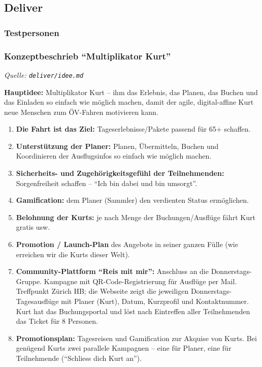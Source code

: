 \clearpage
\pagecolor{anhangPastel}
\subsection{Deliver}

\subsubsection{Testpersonen}
\clearpage
{}

\clearpage
\subsubsection{Konzeptbeschrieb \enquote{Multiplikator Kurt}}
\textit{Quelle: \texttt{deliver/idee.md}}

\medskip
\textbf{Hauptidee:} Multiplikator Kurt -- ihm das Erlebnis, das Planen, das
Buchen und das Einladen so einfach wie möglich machen, damit der agile,
digital-affine Kurt neue Menschen zum ÖV-Fahren motivieren kann.

\begin{enumerate}[nosep]
  \item \textbf{Die Fahrt ist das Ziel:} Tageserlebnisse/Pakete passend für 65+ schaffen.
  \item \textbf{Unterstützung der Planer:} Planen, Übermitteln, Buchen und Koordinieren der Ausflugsinfos so einfach wie möglich machen.
  \item \textbf{Sicherheits- und Zugehörigkeitsgefühl der Teilnehmenden:} Sorgenfreiheit schaffen -- \enquote{Ich bin dabei und bin umsorgt}.
  \item \textbf{Gamification:} dem Planer (Sammler) den verdienten Status ermöglichen.
  \item \textbf{Belohnung der Kurts:} je nach Menge der Buchungen/Ausflüge fährt Kurt gratis usw.
  \item \textbf{Promotion / Launch-Plan} des Angebots in seiner ganzen Fülle (wie erreichen wir die Kurts dieser Welt).
  \item \textbf{Community-Plattform \enquote{Reis mit mir}:} Anschluss an die Donnerstags-Gruppe. Kampagne mit QR-Code-Registrierung für Ausflüge per Mail. Treffpunkt Zürich HB; die Webseite zeigt die jeweiligen Donnerstags-Tagesausflüge mit Planer (Kurt), Datum, Kurzprofil und Kontaktnummer. Kurt hat das Buchungsportal und löst nach Eintreffen aller Teilnehmenden das Ticket für 8 Personen.
  \item \textbf{Promotionsplan:} Tagesreisen und Gamification zur Akquise von Kurts. Bei genügend Kurts zwei parallele Kampagnen -- eine für Planer, eine für Teilnehmende (\enquote{Schliess dich Kurt an}).
\end{enumerate}

